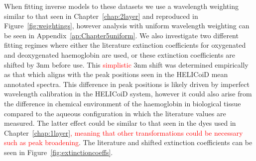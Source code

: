 When fitting inverse models to these datasets we use a wavelength weighting similar to that seen in Chapter~\ref{chap:2layer} and reproduced in Figure~\ref{fig:weightings}, however analysis with uniform wavelength weighting can be seen in Appendix~\ref{ap:Chapter5uniform}. We also investigate two different fitting regimes where either the literature extinction coefficients for oxygenated and deoxygenated haemoglobin are used, or these extinction coefficients are shifted by 3nm before use. This \textcolor{red}{simplistic} 3nm shift was determined empirically as that which aligns with the peak positions seen in the HELICoiD mean annotated spectra. This difference in peak positions is likely driven by imperfect wavelength calibration in the HELICoiD system, however it could also arise from the difference in chemical environment of the haemoglobin in biological tissue compared to the aqueous configuration in which the literature values are measured. The latter effect could be similar to that seen in the dyes used in Chapter~\ref{chap:1layer}\textcolor{red}{, meaning that other transformations could be necessary such as peak broadening}. The literature and shifted extinction coefficients can be seen in Figure~\ref{fig:extinctioncoeffs}.
